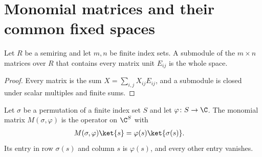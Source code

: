 \section{Monomial matrices and their common fixed spaces}
\label{sec:monomial_matrices}

\begin{lemma}
    \label{thm:monomial_matrix_units_span}
    \leanok
    Let $R$ be a semiring and let $m,n$ be finite index sets. A submodule of
    the $m\times n$ matrices over $R$ that contains every matrix unit
    $E_{ij}$ is the whole space.
\end{lemma}

\begin{proof}\leanok
    Every matrix is the sum $X=\sum_{i,j}X_{ij}E_{ij}$, and a submodule is
    closed under scalar multiples and finite sums.
\end{proof}

\begin{definition}
    \label{def:mpug_monomial_matrix}
    \leanok
    Let $\sigma$ be a permutation of a finite index set $S$ and let
    $\varphi\colon S\to\C$. The monomial matrix $M(\sigma,\varphi)$ is the
    operator on $\C^S$ with
    \begin{align}
        M(\sigma,\varphi)\ket{s} & =\varphi(s)\ket{\sigma(s)}.
        \label{eq:mpug_monomial_matrix}
    \end{align}
    Its entry in row $\sigma(s)$ and column $s$ is $\varphi(s)$, and every
    other entry vanishes.
\end{definition}

